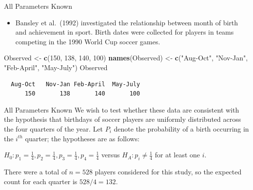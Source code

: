 \documentclass[
  ignorenonframetext,
]{beamer}
\newenvironment{Shaded}{\begin{snugshade}}{\end{snugshade}}
\newcommand{\DecValTok}[1]{\textcolor[rgb]{0.00,0.00,0.81}{#1}}
\newcommand{\FunctionTok}[1]{\textcolor[rgb]{0.13,0.29,0.53}{\textbf{#1}}}
\newcommand{\NormalTok}[1]{#1}
\newcommand{\OtherTok}[1]{\textcolor[rgb]{0.56,0.35,0.01}{#1}}
\newcommand{\StringTok}[1]{\textcolor[rgb]{0.31,0.60,0.02}{#1}}
\providecommand{\tightlist}{%
  \setlength{\itemsep}{0pt}\setlength{\parskip}{0pt}}
\begin{document}
\begin{frame}[fragile]{All Parameters Known}
\protect\hypertarget{all-parameters-known}{}
\begin{itemize}
\tightlist
\item
  Bansley et al.~(1992) investigated the relationship between month of
  birth and achievement in sport. Birth dates were collected for players
  in teams competing in the 1990 World Cup soccer games.
\end{itemize}

\begin{Shaded}
\begin{Highlighting}[]
\NormalTok{Observed }\OtherTok{\textless{}{-}} \FunctionTok{c}\NormalTok{(}\DecValTok{150}\NormalTok{, }\DecValTok{138}\NormalTok{, }\DecValTok{140}\NormalTok{, }\DecValTok{100}\NormalTok{)}
\FunctionTok{names}\NormalTok{(Observed) }\OtherTok{\textless{}{-}} \FunctionTok{c}\NormalTok{(}\StringTok{"Aug{-}Oct"}\NormalTok{, }\StringTok{"Nov{-}Jan"}\NormalTok{, }
                     \StringTok{"Feb{-}April"}\NormalTok{, }\StringTok{"May{-}July"}\NormalTok{)}
\NormalTok{Observed}
\end{Highlighting}
\end{Shaded}

\begin{verbatim}
  Aug-Oct   Nov-Jan Feb-April  May-July 
      150       138       140       100 
\end{verbatim}
\end{frame}

\begin{frame}{All Parameters Known}
\protect\hypertarget{all-parameters-known-1}{}
We wish to test whether these data are consistent with the hypothesis
that birthdays of soccer players are uniformly distributed across the
four quarters of the year. Let \(P_i\) denote the probability of a birth
occurring in the \(i^{th}\) quarter; the hypotheses are as follows:

\(H_0: p_1=\frac{1}{4}, p_2=\frac{1}{4}, p_3=\frac{1}{4}, p_4=\frac{1}{4}\)
versus \(H_A: p_i \neq \frac{1}{4}\) for at least one \(i\).

There were a total of \(n = 528\) players considered for this study, so
the expected count for each quarter is \(528/4 = 132\).
\end{frame}
\end{document}
